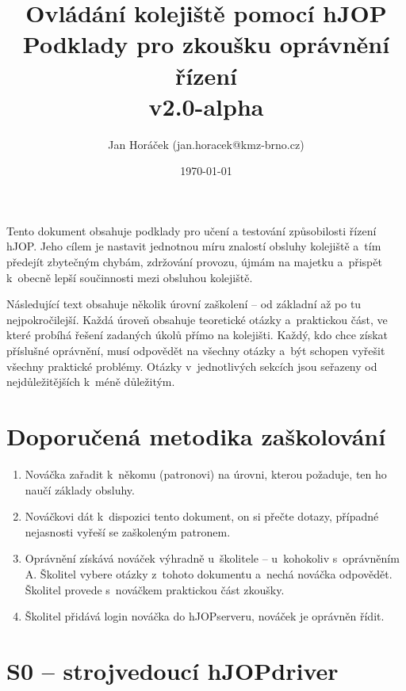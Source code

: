\documentclass[12pt,a4paper]{article}
\begin{document}
\thispagestyle{empty}

\setlength{\parindent}{0cm}
\setlength{\parskip}{1mm plus2pt minus1pt}
\setlength{\droptitle}{-5em}

\title{
\Large Ovládání kolejiště pomocí hJOP\\
\LARGE Podklady pro zkoušku oprávnění řízení\\
\small v2.0-alpha}
\author{Jan Horáček (jan.horacek@kmz-brno.cz)}
\date{\today}
\maketitle

Tento dokument obsahuje podklady pro učení a testování způsobilosti řízení
hJOP. Jeho cílem je nastavit jednotnou míru znalostí obsluhy kolejiště a~tím
předejít zbytečným chybám, zdržování provozu, újmám na majetku a~přispět
k~obecně lepší součinnosti mezi obsluhou kolejiště.

Následující text obsahuje několik úrovní zaškolení – od základní až po tu
nejpokročilejší. Každá úroveň obsahuje teoretické otázky a~praktickou část, ve
které probíhá řešení zadaných úkolů přímo na kolejišti. Každý, kdo chce získat
příslušné oprávnění, musí odpovědět na všechny otázky a~být schopen vyřešit
všechny praktické problémy. Otázky v~jednotlivých sekcích jsou seřazeny od
nejdůležitějších k~méně důležitým.

\section{Doporučená metodika zaškolování}

\begin{enumerate}[leftmargin=*]
\item Nováčka zařadit k~někomu (patronovi) na úrovni, kterou požaduje, ten ho
naučí základy obsluhy.
\item Nováčkovi dát k~dispozici tento dokument, on si přečte dotazy, případné
nejasnosti vyřeší se zaškoleným patronem.
\item Oprávnění získává nováček výhradně u~školitele – u~kohokoliv s~oprávněním
A. Školitel vybere otázky z~tohoto dokumentu a~nechá nováčka odpovědět. Školitel
provede s~no\-váč\-kem praktickou část zkoušky.
\item Školitel přidává login nováčka do hJOPserveru, nováček je oprávněn řídit.
\end{enumerate}

\newpage

\section{S0 – strojvedoucí hJOPdriver}
\end{document}
